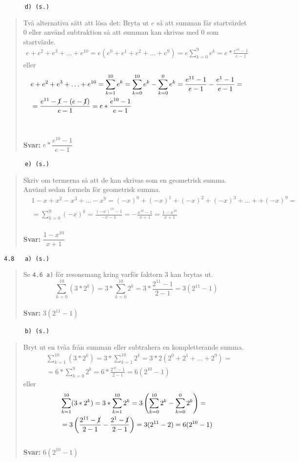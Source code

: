 \documentclass[a4paper]{article}
\newcommand{\tskcol}[1]{\textcolor{tskcol}{#1}}
\begin{document}
	\pagebreak
	\texttt{\tskcol{~~~~~~d) (s.)}}
	\begin{quotation}
		\noindent
		Två alternativa sätt att lösa det: Bryta ut $e$ så att summan får startvärdet $0$ eller använd subtraktion så att summan kan skrivas med $0$ som startvärde.
		\begin{align*}
		e+e^2+e^3+\ldots+e^{10}=
		e(e^0+e^1+e^2+\ldots+e^9)=
		e\sum_{k=0}^{9}e^k=
		e*\frac{e^{10}-1}{e-1}
		\end{align*}
		eller
		\begin{align*}
		&e+e^2+e^3+\ldots+e^{10}=
		\sum_{k=1}^{10}e^k=
		\sum_{k=0}^{10}e^k-\sum_{k=0}^{0}e^k=
		\frac{e^{11}-1}{e-1}-\frac{e^1-1}{e-1}= \\
		&=\frac{e^{11}-\cancel{1}-(e-\cancel{1})}{e-1}=
		e*\frac{e^{10}-1}{e-1}
		\end{align*}
		\\ \\
		\textbf{Svar:} $e*\dfrac{e^{10}-1}{e-1}$
	\end{quotation}
	
	\texttt{\tskcol{~~~~~~e) (s.)}}
	\begin{quotation}
		\noindent
		Skriv om termerna så att de kan skrivas som en geometrisk summa. Använd sedan formeln för geometrisk summa.
		\begin{align*}
		&1-x+x^2-x^3+\ldots-x^9=
		(-x)^0+(-x)^1+(-x)^2+(-x)^3+\ldots++(-x)^9= \\
		&=\sum_{k=0}^{9}(-x)^k=
		\frac{(-x)^{10}-1}{-x-1}=
		-\frac{x^{10}-1}{x+1}=
		\frac{1-x^{10}}{x+1}
		\end{align*}
		\\
		\textbf{Svar:} $\dfrac{1-x^{10}}{x+1}$
	\end{quotation}
	
	\texttt{\tskcol{4.8~~~a) (s.)}}
	\begin{quotation}
		\noindent
		Se \texttt{\tskcol{4.6 a)}} för resonemang kring varför faktorn $3$ kan brytas ut.
		\[\sum_{k=0}^{10}(3*2^k)=
		3*\sum_{k=0}^{10}2^k=
		3*\frac{2^{11}-1}{2-1}=
		3(2^{11}-1)\]
		\\
		\textbf{Svar:} $3(2^{11}-1)$
	\end{quotation}
	
	\pagebreak
	\texttt{\tskcol{~~~~~~b) (s.)}}
	\begin{quotation}
		\noindent
		Bryt ut en tvåa från summan eller subtrahera en kompletterande summa. 
		\begin{align*}
		&\sum_{k=1}^{10}(3*2^k)=
		3*\sum_{k=1}^{10}2^k=
		3*2(2^0+2^1+\ldots+2^9)= \\
		&=6*\sum_{k=0}^{9}2^k=
		6*\frac{2^{10}-1}{2-1}=
		6(2^{10}-1)
		\end{align*}
		eller
		\begin{align*}
		&\sum_{k=1}^{10}(3*2^k)=
		3*\sum_{k=1}^{10}2^k=
		3\left(\sum_{k=0}^{10}2^k-\sum_{k=0}^{0}2^k\right)= \\
		&=3\left(\frac{2^{11}-\cancel{1}}{2-1}-\frac{2^1-\cancel{1}}{2-1}\right)=
		3(2^{11}-2)=
		6(2^{10}-1)
		\end{align*}
		\\
		\textbf{Svar:} $6(2^{10}-1)$
	\end{quotation}
	
\end{document}
